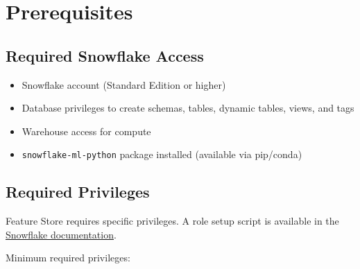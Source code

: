 \documentclass[
  letterpaper,
  DIV=11,
  numbers=noendperiod]{scrreprt}
\providecommand{\tightlist}{%
  \setlength{\itemsep}{0pt}\setlength{\parskip}{0pt}}\usepackage{longtable,booktabs,array}
\begin{document}
\hypertarget{prerequisites-1}{%
\section{Prerequisites}\label{prerequisites-1}}

\hypertarget{required-snowflake-access}{%
\subsection{Required Snowflake Access}\label{required-snowflake-access}}

\begin{itemize}
\tightlist
\item
  Snowflake account (Standard Edition or higher)
\item
  Database privileges to create schemas, tables, dynamic tables, views,
  and tags
\item
  Warehouse access for compute
\item
  \texttt{snowflake-ml-python} package installed (available via
  pip/conda)
\end{itemize}

\hypertarget{required-privileges}{%
\subsection{Required Privileges}\label{required-privileges}}

Feature Store requires specific privileges. A role setup script is
available in the
\href{https://docs.snowflake.com/en/developer-guide/snowflake-ml/feature-store/rbac}{Snowflake
documentation}.

Minimum required privileges:
\end{document}
